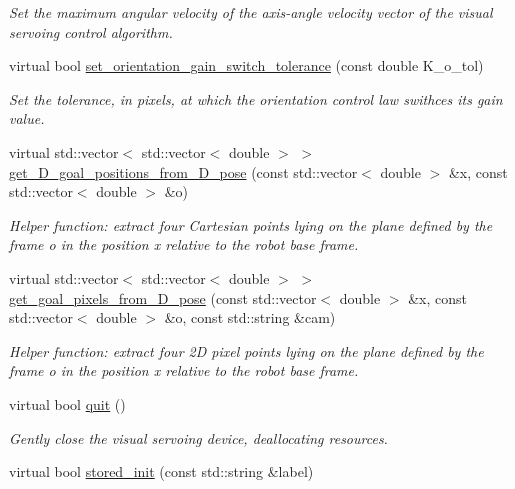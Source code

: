\begin{DoxyCompactItemize}
\begin{DoxyCompactList}\small\item\em Set the maximum angular velocity of the axis-\/angle velocity vector of the visual servoing control algorithm. \end{DoxyCompactList}\item 
virtual bool \hyperlink{classVisualServoingIDL_acaf4ad7fa8a2443d4719e3f56b8d72b0}{set\+\_\+orientation\+\_\+gain\+\_\+switch\+\_\+tolerance} (const double K\+\_\+o\+\_\+tol)
\begin{DoxyCompactList}\small\item\em Set the tolerance, in pixels, at which the orientation control law swithces its gain value. \end{DoxyCompactList}\item 
virtual std\+::vector$<$ std\+::vector$<$ double $>$ $>$ \hyperlink{classVisualServoingIDL_a175b2d3fb77000e0012c7a8d16e9a379}{get\+\_\+D\+\_\+goal\+\_\+positions\+\_\+from\+\_\+D\+\_\+pose} (const std\+::vector$<$ double $>$ \&x, const std\+::vector$<$ double $>$ \&o)
\begin{DoxyCompactList}\small\item\em Helper function\+: extract four Cartesian points lying on the plane defined by the frame o in the position x relative to the robot base frame. \end{DoxyCompactList}\item 
virtual std\+::vector$<$ std\+::vector$<$ double $>$ $>$ \hyperlink{classVisualServoingIDL_afb359486a7e42bfda3ddf66a2e518e90}{get\+\_\+goal\+\_\+pixels\+\_\+from\+\_\+D\+\_\+pose} (const std\+::vector$<$ double $>$ \&x, const std\+::vector$<$ double $>$ \&o, const std\+::string \&cam)
\begin{DoxyCompactList}\small\item\em Helper function\+: extract four 2D pixel points lying on the plane defined by the frame o in the position x relative to the robot base frame. \end{DoxyCompactList}\item 
virtual bool \hyperlink{classVisualServoingIDL_a3d5503e1d4bb2b25a11cbd5357b3013b}{quit} ()
\begin{DoxyCompactList}\small\item\em Gently close the visual servoing device, deallocating resources. \end{DoxyCompactList}\item 
virtual bool \hyperlink{classVisualServoingIDL_a20ff1561b87126c9b852eacd5ea59d26}{stored\+\_\+init} (const std\+::string \&label)

\end{DoxyCompactItemize}
